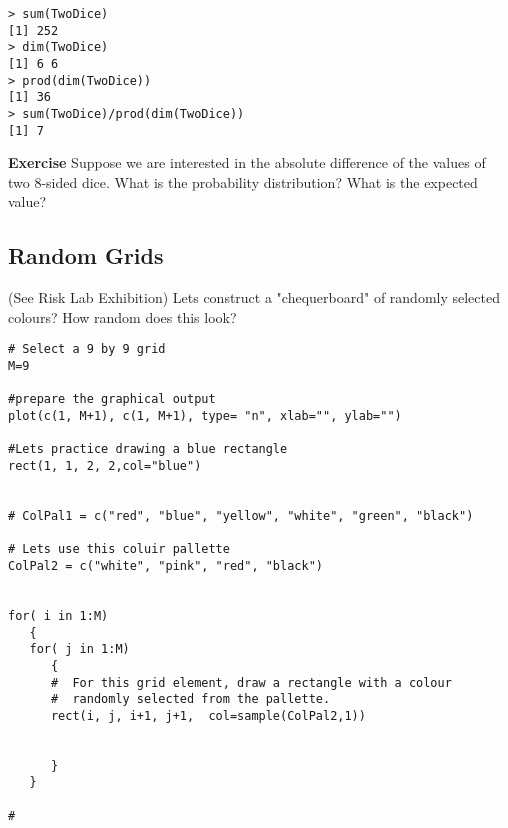 \documentclass[a4paper,12pt]{article}
\begin{document}
\begin{verbatim}
> sum(TwoDice)
[1] 252
> dim(TwoDice)
[1] 6 6
> prod(dim(TwoDice))
[1] 36
> sum(TwoDice)/prod(dim(TwoDice))
[1] 7
\end{verbatim}

\textbf{Exercise} Suppose we are interested in the absolute difference of the values of two 8-sided dice. What is the probability distribution? What is the expected value?



\newpage
\subsection{Random Grids}
(See Risk Lab Exhibition) Lets construct a "chequerboard"  of randomly selected colours? How random does this look?
\begin{framed}
\begin{verbatim}
# Select a 9 by 9 grid
M=9

#prepare the graphical output
plot(c(1, M+1), c(1, M+1), type= "n", xlab="", ylab="")

#Lets practice drawing a blue rectangle
rect(1, 1, 2, 2,col="blue")


# ColPal1 = c("red", "blue", "yellow", "white", "green", "black") 

# Lets use this coluir pallette
ColPal2 = c("white", "pink", "red", "black")


for( i in 1:M)
   {
   for( j in 1:M)
      {
      #  For this grid element, draw a rectangle with a colour
      #  randomly selected from the pallette.
      rect(i, j, i+1, j+1,  col=sample(ColPal2,1))


      }
   }

#
\end{verbatim}
\end{framed}
\end{document}
